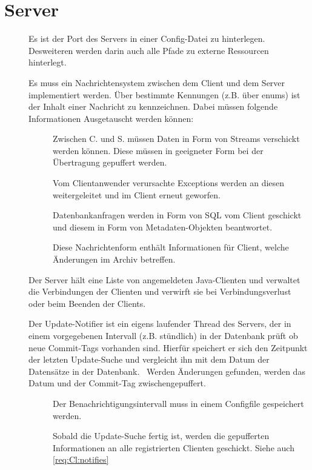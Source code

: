 \section{Server} \label{spec:server}
\begin{description}
	\item []
		Es ist der Port des Servers in einer Config-Datei zu hinterlegen.
		Desweiteren werden darin auch alle Pfade zu externe Ressourcen
		hinterlegt.
	\item []
		Es muss ein Nachrichtensystem zwischen dem Client und dem Server implementiert werden.
		Über bestimmte Kennungen (z.B. über enums) ist der Inhalt einer Nachricht zu kennzeichnen.
		Dabei müssen folgende Informationen Ausgetauscht werden können:
		\begin{description}
	\item []
		Zwischen C. und S. müssen Daten in Form von Streams verschickt werden können.
		Diese müssen in geeigneter Form bei der Übertragung gepuffert werden.
	\item []
		Vom Clientanwender verursachte Exceptions werden an diesen weitergeleitet und 
		im Client erneut geworfen.
	\item []
		Datenbankanfragen werden in Form von SQL vom Client geschickt und diesem
		in Form von Metadaten-Objekten beantwortet.
	\item []
		Diese Nachrichtenform enthält Informationen für Client, welche Änderungen im Archiv betreffen.
\end{description}
	\item []
		Der Server hält eine Liste von angemeldeten Java-Clienten und 
		verwaltet die Verbindungen der Clienten und verwirft sie bei Verbindungsverlust oder 
		beim Beenden der Clients. 
	\item []
		Der Update-Notifier ist ein eigens laufender Thread des Servers, der in einem vorgegebenen Intervall (z.B. stündlich) in der Datenbank prüft ob neue Commit-Tags vorhanden sind.
		Hierfür speichert er sich den Zeitpunkt der letzten Update-Suche und vergleicht ihn mit dem Datum der Datensätze in der Datenbank.
\		Werden Änderungen gefunden, werden das Datum und der Commit-Tag zwischengepuffert.
		\begin{description}
			\item []
				Der Benachrichtigungsintervall muss in einem Configfile gespeichert werden.
			\item []
				Sobald die Update-Suche fertig ist, 
				werden die gepufferten Informationen an alle registrierten Clienten geschickt.
				Siehe auch \ref{req:Cl:notifies}
		\end{description}
\end{description}

